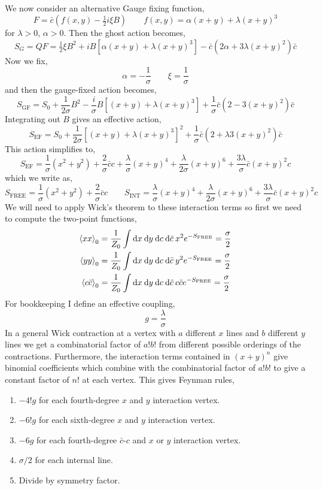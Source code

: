 \documentclass[12pt]{article}
\begin{document}
We now consider an alternative Gauge fixing function,
\[ F = \bar{c} \left( f(x,y) - \tfrac{1}{2} i \xi B \right) \quad \quad f(x,y) = \alpha (x + y) + \lambda (x + y)^3 \]
for $\lambda > 0$, $\alpha > 0$. Then the ghost action becomes,
\[ S_G = QF = \tfrac{1}{2} \xi B^2 + i B \left[ \alpha (x + y) + \lambda (x + y)^3 \right] - \bar{c} \left(2 \alpha + 3 \lambda (x + y)^2 \right) \bar{c} \]
Now we fix,
\[ \alpha = - \frac{1}{\sigma} \quad \quad \xi = \frac{1}{\sigma} \]
and then the gauge-fixed action becomes,
\[ S_{\text{GF}} = S_0  + \frac{1}{2\sigma} B^2 - \frac{i}{\sigma} B \left[ (x + y) + \lambda (x + y)^3 \right]  + \frac{1}{\sigma} \bar{c} \left(2  - 3 (x + y)^2 \right) \bar{c} \]
Integrating out $B$ gives an effective action,
\[ S_{\text{EF}} = S_0 + \frac{1}{2 \sigma} \left[ (x + y) + \lambda (x + y)^3 \right]^2 + \frac{1}{\sigma} \bar{c} \left(2  + \lambda 3 (x + y)^2 \right) \bar{c} \]
This action simplifies to,
\[ S_{\text{EF}} = \frac{1}{\sigma} (x^2 + y^2) + \frac{2}{\sigma} \bar{c} c + \frac{\lambda}{\sigma} (x + y)^4 + \frac{\lambda}{2 \sigma} (x + y)^6 
+ \frac{3 \lambda}{\sigma} \bar{c} (x + y)^2 c \]
which we write as,
\[ S_{\text{FREE}} = \frac{1}{\sigma} (x^2 + y^2) + \frac{2}{\sigma} \bar{c} c \quad \quad S_{\text{INT}} = \frac{\lambda}{\sigma} (x + y)^4 + \frac{\lambda}{2 \sigma} (x + y)^6 
+ \frac{3\lambda}{\sigma} \bar{c} (x + y)^2 c \]
We will need to apply Wick's theorem to these interaction terms so first we need to compute the two-point functions,
\begin{align*}
\left< x x \right>_0 & = \frac{1}{Z_0} \int \mathrm{d}x \: \mathrm{d}y \: \mathrm{d}c \: \mathrm{d}\bar{c} \: x^2 e^{- S_{\text{FREE}}}  = \frac{\sigma}{2}  
\\
\left< y y \right>_0 & = \frac{1}{Z_0} \int \mathrm{d}x \: \mathrm{d}y \: \mathrm{d}c \: \mathrm{d}\bar{c} \: y^2 e^{- S_{\text{FREE}}}  = \frac{\sigma}{2} 
\\
\left< c \bar{c} \right>_0 & = \frac{1}{Z_0} \int \mathrm{d}x \: \mathrm{d}y \: \mathrm{d}c \: \mathrm{d}\bar{c} \: c \bar{c} e^{- S_{\text{FREE}}}  = \frac{\sigma}{2} 
\end{align*}
For bookkeeping I define an effective coupling,
\[ g = \frac{\lambda}{\sigma} \]
In a general Wick contraction at a vertex with $a$ different $x$ lines and $b$ different $y$ lines we get a combinatorial factor of $a! b!$ from different possible orderings of the contractions. Furthermore, the interaction terms contained in $(x + y)^n$ give binomial coefficients which combine with the combinatorial factor of $a! b!$ to give a constant factor of $n!$ at each vertex.  
This gives Feynman rules,
\begin{enumerate}
\item $-4! g$ for each fourth-degree $x$ and $y$ interaction vertex.
\item $-6! g$ for each sixth-degree $x$ and $y$ interaction vertex.
\item $ -6 g$ for each fourth-degree $\bar{c}$-$c$ and $x$ or $y$ interaction vertex.   
\item $\sigma / 2$ for each internal line. 
\item Divide by symmetry factor.
\end{enumerate}
\end{document}
